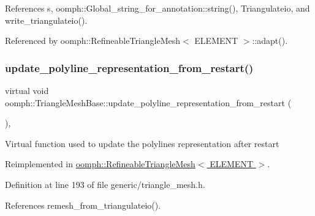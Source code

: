 References s, oomph\+::\+Global\+\_\+string\+\_\+for\+\_\+annotation\+::string(), Triangulateio, and write\+\_\+triangulateio().



Referenced by oomph\+::\+Refineable\+Triangle\+Mesh$<$ E\+L\+E\+M\+E\+N\+T $>$\+::adapt().

\mbox{\label{classoomph_1_1TriangleMeshBase_ae822f78ce56d1ff9a3c06d7ec8bc2563}} 
\subsubsection{\texorpdfstring{update\+\_\+polyline\+\_\+representation\+\_\+from\+\_\+restart()}{update\_polyline\_representation\_from\_restart()}}
{\footnotesize\ttfamily virtual void oomph\+::\+Triangle\+Mesh\+Base\+::update\+\_\+polyline\+\_\+representation\+\_\+from\+\_\+restart (\begin{DoxyParamCaption}{ }\end{DoxyParamCaption})\hspace{0.3cm}{\ttfamily [inline]}, {\ttfamily [virtual]}}

Virtual function used to update the polylines representation after restart 

Reimplemented in \hyperlink{classoomph_1_1RefineableTriangleMesh_a26cdfda4b77158dd24641cb5889ad2ff}{oomph\+::\+Refineable\+Triangle\+Mesh$<$ E\+L\+E\+M\+E\+N\+T $>$}.



Definition at line 193 of file generic/triangle\+\_\+mesh.\+h.



References remesh\+\_\+from\+\_\+triangulateio().

\mbox{\label{classoomph_1_1TriangleMeshBase_a69a2fe3d5e77ec39b9df4b3174b58c47}} 
